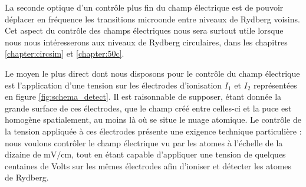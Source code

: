 La seconde optique d'un contrôle plus fin du champ électrique est de pouvoir déplacer en fréquence %
les transitions microonde entre niveaux de Rydberg voisins.
Cet aspect du contrôle des champs électriques nous sera surtout utile lorsque nous nous intéresserons aux niveaux de Rydberg circulaires, dans les chapitres \ref{chapter:circsim} et \ref{chapter:50c}.
	
Le moyen le plus direct dont nous disposons pour le contrôle du champ électrique est l'application d'une tension sur les électrodes d'ionisation $I_1$ et $I_2$ représentées en figure \eqref{fig:schema_detect}.
Il est raisonnable de supposer, étant donnée la grande surface de ces électrodes, que le champ créé entre celles-ci et la puce est homogène spatialement, au moins là où se situe le nuage atomique.
Le contrôle de la tension appliquée à ces électrodes présente une exigence technique particulière :
nous voulons contrôler le champ électrique vu par les atomes à l'échelle de la dizaine de $\si{\mV/\cm}$, tout en étant capable d'appliquer une tension de quelques centaines de Volts sur les mêmes électrodes afin d'ioniser et détecter les atomes de Rydberg.

